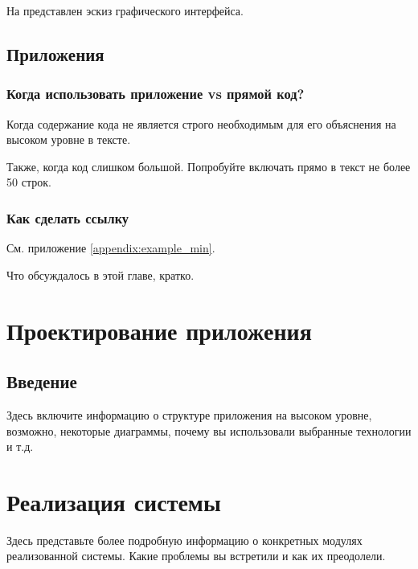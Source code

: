 \documentclass[a4paper,12pt]{report}
\begin{document}
На  представлен эскиз графического интерфейса.


\section{Приложения}

\subsection{Когда использовать приложение vs прямой код?}

Когда содержание кода не является строго необходимым
для его объяснения на высоком уровне в тексте.

Также, когда код слишком большой.
Попробуйте включать прямо в текст не более 50 строк.

\subsection{Как сделать ссылку}

См. приложение \ref{appendix:example_min}.


Что обсуждалось в этой главе, кратко.

\chapter{Проектирование приложения}\label{architecture_chapter_title}

\section{Введение}

Здесь включите информацию о структуре приложения на высоком уровне,
возможно, некоторые диаграммы, почему вы использовали выбранные технологии и т.д.


\chapter{Реализация системы}\label{implementation_chapter_title}

Здесь представьте более подробную информацию о конкретных модулях реализованной системы.
Какие проблемы вы встретили и как их преодолели.
\end{document}
